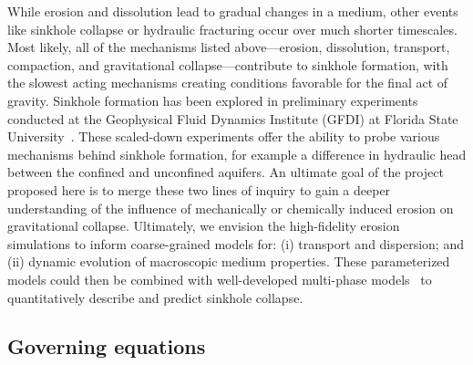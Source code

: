 \documentclass[11pt]{article}
\begin{document}
While erosion and dissolution lead to gradual changes in a medium, other events like sinkhole collapse or hydraulic fracturing occur over much shorter timescales.  Most likely, all of the mechanisms listed above---erosion, dissolution, transport, compaction, and gravitational collapse---contribute to sinkhole formation, with the slowest acting mechanisms creating conditions favorable for the final act of gravity. Sinkhole formation has been explored in preliminary experiments conducted at the Geophysical Fluid Dynamics Institute (GFDI) at Florida State University~\cite{tao2014experimental}. These scaled-down experiments offer the ability to probe various mechanisms behind sinkhole formation, for example a difference in hydraulic head between the confined and unconfined aquifers. An ultimate goal of the project proposed here is to merge these two lines of inquiry to gain a deeper understanding of the influence of mechanically or chemically induced erosion on gravitational collapse.  Ultimately, we envision the high-fidelity erosion simulations to inform coarse-grained models for: (i) transport and dispersion; and (ii) dynamic evolution of macroscopic medium properties. These parameterized models could then be combined with well-developed multi-phase models~\cite{Imma2019, eastham2019multiphase} to quantitatively describe and predict sinkhole collapse.


\subsection{Governing equations}
\end{document}

